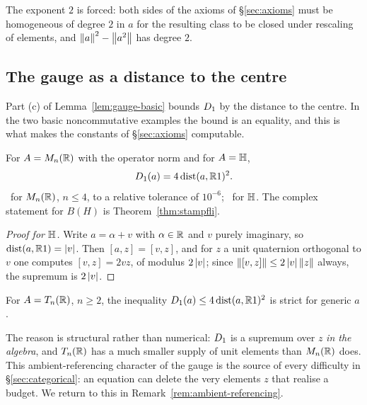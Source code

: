 \begin{remark}
The exponent $2$ is forced: both sides of the axioms of \S\ref{sec:axioms} must
be homogeneous of degree $2$ in $a$ for the resulting class to be closed under
rescaling of elements, and $\left\lVert a\right\rVert^2-\left\lVert a^2\right\rVert$ has degree $2$.
\end{remark}

\subsection{The gauge as a distance to the centre}

Part (c) of Lemma~\ref{lem:gauge-basic} bounds $D_1$ by the distance to the
centre.  In the two basic noncommutative examples the bound is an equality, and
this is what makes the constants of \S\ref{sec:axioms} computable.

\begin{proposition}\label{prop:real-stampfli}
For $A=M_n(\mathbb{R})$ with the operator norm and for $A=\mathbb{H}$,
\[
  D_1(a)=4\operatorname{dist}(a,\mathbb{R}1)^2 .
\]
\statusnum\ for $M_n(\mathbb{R})$, $n\le4$, to a relative tolerance of $10^{-6}$;
\statusproved\ for $\mathbb{H}$.  The complex statement for $B(H)$ is
Theorem~\ref{thm:stampfli}.
\end{proposition}

\begin{proof}[Proof for $\mathbb{H}$]
Write $a=\alpha+v$ with $\alpha\in\mathbb{R}$ and $v$ purely imaginary, so
$\operatorname{dist}(a,\mathbb{R}1)=\left\lvert v\right\rvert$.  Then $[a,z]=[v,z]$, and for $z$ a unit quaternion
orthogonal to $v$ one computes $[v,z]=2vz$, of modulus $2\left\lvert v\right\rvert$; since
$\left\lVert[v,z]\right\rVert\le2\left\lvert v\right\rvert\left\lVert z\right\rVert$ always, the supremum is $2\left\lvert v\right\rvert$.
\end{proof}

\begin{proposition}
\label{prop:stampfli-fails-T}
For $A=T_n(\mathbb{R})$, $n\ge2$, the inequality $D_1(a)\le4\operatorname{dist}(a,\mathbb{R}1)^2$ is
strict for generic $a$.  \statusnum
\end{proposition}

\noindent
The reason is structural rather than numerical: $D_1$ is a supremum over
$z$ \emph{in the algebra}, and $T_n(\mathbb{R})$ has a much smaller supply of unit
elements than $M_n(\mathbb{R})$ does.  This ambient-referencing character of the gauge
is the source of every difficulty in \S\ref{sec:categorical}: an equation can
delete the very elements $z$ that realise a budget.  We return to this in
Remark~\ref{rem:ambient-referencing}.

